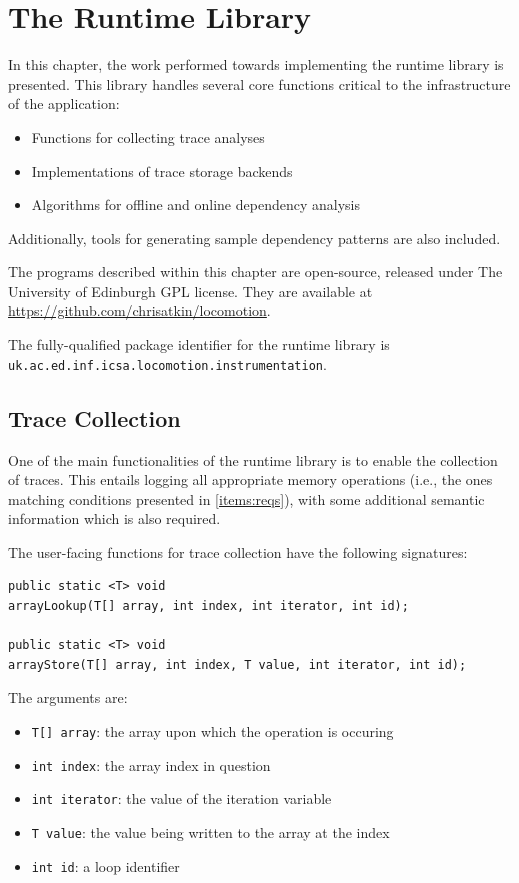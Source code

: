 \chapter{The Runtime Library} \label{chp:runtime}
In this chapter, the work performed towards implementing the runtime library is presented. This library handles several core functions critical to the infrastructure of the application:

\begin{itemize}
	\item Functions for collecting trace analyses
	\item Implementations of trace storage backends
	\item Algorithms for offline and online dependency analysis
\end{itemize}

Additionally, tools for generating sample dependency patterns are also included.

The programs described within this chapter are open-source, released under The University of Edinburgh GPL license. They are available at \url{https://github.com/chrisatkin/locomotion}.

The fully-qualified package identifier for the runtime library is\\\texttt{uk.ac.ed.inf.icsa.locomotion.instrumentation}.

\section{Trace Collection} \label{sec:runtime/trace-collection}
One of the main functionalities of the runtime library is to enable the collection of traces. This entails logging all appropriate memory operations (i.e., the ones matching conditions presented in \ref{items:reqs}), with some additional semantic information which is also required.

The user-facing functions for trace collection have the following signatures:

\begin{verbatim}
public static <T> void
arrayLookup(T[] array, int index, int iterator, int id);

public static <T> void
arrayStore(T[] array, int index, T value, int iterator, int id);
\end{verbatim}

The arguments are:

\begin{itemize} \label{items:trace-args}
	\item \texttt{T[] array}: the array upon which the operation is occuring
	\item \texttt{int index}: the array index in question
	\item \texttt{int iterator}: the value of the iteration variable
	\item \texttt{T value}: the value being written to the array at the index
	\item \texttt{int id}: a loop identifier
\end{itemize}

